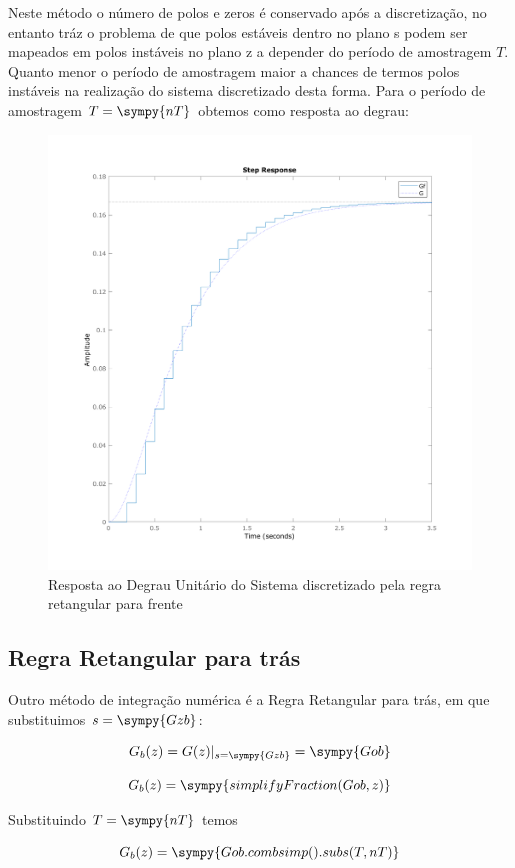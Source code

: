 \documentclass[a4paper,11pt]{article}
\begin{document}
Neste método o número de polos e zeros é conservado após a discretização, no entanto tráz o problema de que polos estáveis dentro no plano s podem ser mapeados em polos instáveis no plano z a depender do período de amostragem $T$. Quanto menor o período de amostragem maior a chances de termos polos instáveis na realização do sistema discretizado desta forma. Para o período de amostragem $T=\sympy{nT}$  obtemos como resposta ao degrau:

\begin{figure}[H]
    \centering
    \includegraphics[width=0.8\linewidth]{img/exsim2-plot-g-forward.png}
    \caption{Resposta ao Degrau Unitário do Sistema discretizado pela regra retangular para frente}
\end{figure}

\subsection{Regra Retangular para trás}

Outro método de integração numérica é a Regra Retangular para trás, em que substituimos $s = \sympy{Gzb}$:

$$
    G_b(z) =  G(z)|_{s = \sympy{Gzb}} = \sympy{Gob}
$$

$$
    G_b(z) = \sympy{simplifyFraction(Gob,z)}
$$

Substituindo $T=\sympy{nT}$ temos

\begin{equation}
    G_b(z) = \sympy{Gob.combsimp().subs(T,nT)}
\end{equation}
\end{document}
